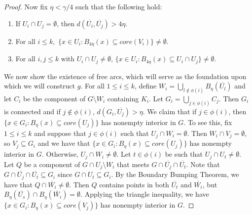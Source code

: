 \documentclass{amsart}
\numberwithin{equation}{section}
\begin{document}
\begin{proof}
Now fix $\eta <\gamma/4$ such that the following hold: 

\begin{enumerate}
    \item[(1)] If $U_i\cap U_j= \emptyset$, then $d(\overline{U_i},\overline{U_j})> 4\eta$.
    \item[(2)]For all $i\leq k,$ $\{x\in U_i:B_{4\eta}(x)\subseteq core(V_i)\}\neq \emptyset$.
    \item[(3)] For all $i,j\leq k$ with $U_i\cap U_j\neq \emptyset$, $\{x\in U_i:B_{4\eta}(x)\subseteq U_i\cap U_j\} \neq \emptyset$.
\end{enumerate}

We now show the existence of free arcs, which will serve as the foundation upon which we will construct $g$. For all $1\leq i \leq k$, define $W_i= \bigcup_{l\notin \phi(i)} B_\eta(\overline{U_l}) $ and let $C_i$ be the component of $G\setminus W_i$ containing $K_i$. Let  $G_i = \bigcup_{j\in \phi(i)} C_j $. Then $G_i$ is connected and if $j\notin \phi(i)$, $d(G_i,\overline{U_j})>\eta.$ We claim that if $j\in \phi(i)$, then $\{x\in G_i : B_\eta(x)\subseteq core(U_j)\}$ has nonempty interior in $G$. To see this, fix $1\leq i\leq k$ and suppose that $j\in \phi(i)$ such that $U_j\cap W_i=\emptyset$. Then $W_i\cap V_j=\emptyset$, so $V_j\subseteq G_i$ and we have that $\{x\in G_i : B_\eta(x)\subseteq core(U_j)\}$ has nonempty interior in $G$. Otherwise, $U_j\cap W_i\neq \emptyset.$ Let $t\in \phi(i)$ be such that $U_j\cap U_t\neq \emptyset$. Let $Q$ be a component of $G\cap U_j\setminus W_i$ that meets $G\cap \overline{U_j}\cap \overline{U_t}$. Note that $G\cap \overline{U_j}\cap\overline{U_t}\subseteq G_i$ since $G\cap U_t\subseteq G_i$. By the Boundary Bumping Theorem, we have that $Q\cap \overline{W_i}\neq \emptyset$. Then $Q$ contains points in both $\overline{U_t}$ and $\overline{W_i}$, but $B_\eta(\overline{U_s})\cap B_\eta(\overline{W_i})=\emptyset.$ Applying the triangle inequality, we have $\{x\in G_i: B_\eta(x)\subseteq core(V_j)\}$  has nonempty interior in $G$. 


\end{proof}
\end{document}

